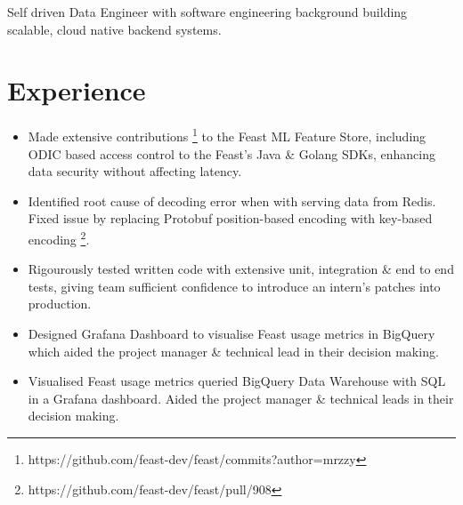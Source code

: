 %
%


\fancyhead{} %


Self driven Data Engineer with software engineering background building scalable, cloud native backend systems.

\section{Experience}
\begin{itemize}
  \item Made extensive contributions \footnote{https://github.com/feast-dev/feast/commits?author=mrzzy} 
    to the Feast ML Feature Store, including ODIC based access control to the Feast's Java 
    \& Golang SDKs, enhancing data security without affecting latency.

  \item Identified root cause of decoding error when with serving data from Redis.
    Fixed issue by replacing Protobuf position-based encoding with key-based encoding
    \footnote{https://github.com/feast-dev/feast/pull/908}.

  \item Rigourously tested written code with extensive unit, integration \& end to end tests,
    giving team sufficient confidence to introduce an intern's patches into production.

  \item Designed Grafana Dashboard to visualise Feast usage metrics in BigQuery which aided the project manager \& technical lead in their decision making.

  \item Visualised Feast usage metrics queried BigQuery Data Warehouse with SQL 
    in a Grafana dashboard. Aided the project manager \& technical leads in their decision making.
\end{itemize}

